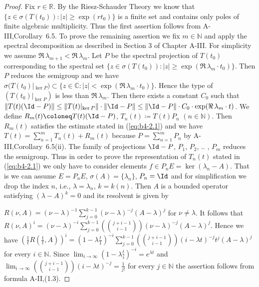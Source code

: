 \begin{proof}
	Fix $r \in \mathbb{R}$.
	By the Riesz-Schauder Theory we know that
	$\{z \in \sigma(T(t_{0})) \colon |z| \geq \exp(rt_{0})\}$ is a finite set and contains only
	poles of finite algebraic multiplicity.
	Thus the first assertion
	follows from A-III,Corollary~6.5.
	To prove the remaining assertion we fix $m \in \mathbb{N}$ and apply the spectral
	decomposition as described in Section 3 of Chapter A-III.
	For simplicity we assume $\Re\,\lambda_{m+1} < \Re\,  \lambda_m$.
	Let $P$ be the spectral projection
	of $T(t_{0})$ corresponding to the spectral set $\{z \in \sigma(T(t_{0})) :
	|z| \geq \exp(\Re\,\lambda_m \cdot t_{0})\}$.
	Then $P$ reduces the semigroup and we have
	$\sigma(T(t_{0})|_{\ker P}) \subset \{z \in \mathbb{C} \colon |z| < \exp(\Re\,\lambda_m \cdot t_{0})\}$.
	Hence the type of
	$(T(t_{0})|_{\ker P})$ is less than $\Re\,\lambda_m$.
	Then there exists a constant $C_{0}$
	such that
%
%
%
\newpage
%
$\|T(t)(\Id -P)\| \leq \|T(t)|_{\ker P}\|\cdot\|\Id -P\| \leq \|\Id -P\|\cdot C_{0} \cdot \exp(\Re\,\lambda_m \cdot t)$.
We define $R_m(t)  \coloneq  T(t)(\Id -P)$, $T_n(t)  \coloneq  T(t)P_n$ $(n \in \mathbb{N})$.
Then $R_m(t)$ satisfies the estimate stated in (\ref{eq:b4-2.1}) and we have $T(t) =
\sum_{n=1}^m T_n(t) + R_m(t)$ because $P = \sum_{n=1}^m P_n$ by A-III,Corollary~6.5(ii).
The family of projections $\Id -P$, $P_1$, $P_2$, .. , $P_m$ reduces the semigroup.
Thus in order to prove the representation of $T_n(t)$ stated in
(\ref{eq:b4-2.1}) we only have to consider elements $f \in P_n E = \ker(\lambda_n-A)$.
That is we can assume $E = P_n E$, $\sigma(A) = \{\lambda_n\}$, $P_n = \Id $ and for simplification
we drop the index $n$, i.e., $\lambda = \lambda_n$, $k = k(n)$.
Then $A$ is a bounded operator satisfying $(\lambda - A)^k = 0$ and its resolvent is given by

$R(\nu,A) = (\nu-\lambda)^{-1}\sum_{j=0}^{k-1}(\nu-\lambda)^{-j}(A-\lambda)^j$ for $\nu \neq \lambda$.
It follows that
$R(\nu,A)^i = (\nu-\lambda)^{-i}\sum_{j=0}^{k-1}(\binom{j+i-1}{i-1})(\nu-\lambda)^{-j}(A-\lambda)^j$.
Hence we have
$(\frac{1}{t}R(\frac{1}{t},A))^i = (1-\lambda\frac{t}{1})^{-i}\sum_{j=0}^{k-1}(\binom{j+i-1}{i-1})(i-\lambda t)^{-j}t^j(A-\lambda)^j$ for every $i \in \mathbb{N}$.
Since $\lim_{i\to\infty}(1-\lambda\frac{t}{i})^{-i} = e^{\lambda t}$ and $\lim_{i\to\infty}(\binom{j+i-1}{i-1})(i-\lambda t)^{-j} = \frac{1}{j!}$ for
every $j \in \mathbb{N}$ the assertion follows from formula A-II,(1.3).
\end{proof}

